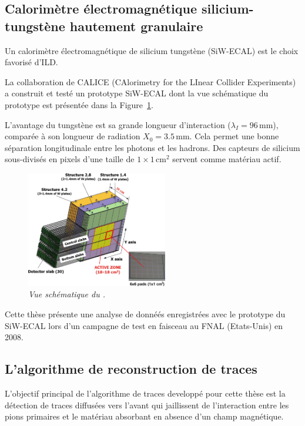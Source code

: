 \subsection*{Calorim\`etre \'electromagn\'etique silicium-tungst\`ene hautement granulaire}

Un calorim\`etre \'electromagn\'etique de silicium tungst\`ene (SiW-ECAL) est le
choix favorisé d'ILD.

La collaboration de CALICE (CAlorimetry for the LInear Collider Experiments) a construit et testé un prototype SiW-ECAL dont la vue schématique du prototype est présentée dans la Figure~\ref {fig:ECAL-schemeF}.

L'avantage du tungstène est sa grande longueur d'interaction ($\lambda_I = 96$\,mm), compar\'ee \`a son longueur de radiation  $X_0 = 3.5$\,mm. Cela permet une bonne s\'eparation longitudinale entre les photons et les hadrons. 
Des capteurs de silicium sous-divisés en pixels d'une taille de $1\times1$\,cm$^2$ servent comme mat\'eriau actif. 
\begin{figure}
	\centering
	\includegraphics[width=0.55\textwidth]{ECAL/graphics/ecal-new.png}
	\caption{\label{fig:ECAL-schemeF} \sl  Vue sch\'ematique du \ecal.}
\end{figure}

Cette thèse présente une analyse de donnéés enregistrées avec le prototype du SiW-ECAL lors d'un campagne de test en faisceau au FNAL (Etats-Unis) en 2008.  
\newpage
\subsection*{L'algorithme de reconstruction de traces}
L'objectif principal de l'algorithme de traces developpé pour cette thèse est la détection de traces diffusées vers l'avant qui jaillissent de l'interaction entre les pions primaires et le matériau absorbant en absence d'un champ magnétique.

